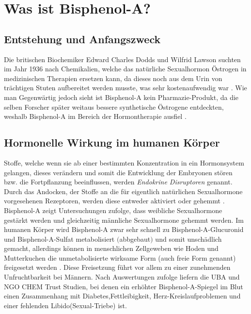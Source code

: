 \section{Was ist Bisphenol-A?}
\subsection{Entstehung und Anfangszweck}
Die britischen Biochemiker Edward Charles Dodds und Wilfrid Lawson suchten
im Jahr 1936 nach Chemikalien, welche das natürliche Sexualhormon Östrogen in medizinischen
Therapien ersetzen kann, da dieses noch aus dem Urin von trächtigen Stuten
aufbereitet werden musste, was sehr kostenaufwendig war \cite[]{Umweltbundesamt2010}.
Wie man Gegenwärtig jedoch sieht ist Bisphenol-A kein Pharmazie-Produkt, da die selben Forscher
später weitaus bessere synthetische Östrogene entdeckten, weshalb Bisphenol-A im Bereich
der Hormontherapie ausfiel \cite{Wikipedia}.
\subsection{Hormonelle Wirkung im humanen Körper}
Stoffe, welche wenn sie ab einer bestimmten Konzentration in ein Hormonsystem gelangen,
dieses verändern und somit die Entwicklung der Embryonen stören bzw. die Fortpflanzung
beeinflussen, werden \textit{Endokrine Disruptoren} genannt.
Durch das Andocken, der Stoffe an die für eigentlich natürlichen Sexualhormone
vorgesehenen Rezeptoren, werden diese entweder aktiviert oder gehemmt \cite{Umweltbundesamt2010}.
Bisphenol-A zeigt Untersuchungen zufolge, dass weibliche Sexualhormone gestärkt werden und
gleichzeitig männliche Sexualhormone gehemmt werden.
Im humanen Körper wird Bisphenol-A zwar sehr schnell zu Bisphenol-A-Glucuronid und
Bisphenol-A-Sulfat metabolisiert $($abbgebaut$)$ und somit unschädlich gemacht, allerdings
können in menschlichen Zellgeweben wie Hoden und Mutterkuchen die unmetabolisierte wirksame
Form (auch freie Form genannt) freigesetzt werden \cite{Umweltbundesamt2010}.
Diese Freisetzung führt vor allem zu einer zunehmenden Unfruchtbarkeit bei Männern. Nach Auswertungen zufolge liefern die UBA und NGO CHEM Trust Studien, bei denen ein erhöhter Bisphenol-A-Spiegel im Blut einen Zusammenhang mit Diabetes,Fettleibigkeit, Herz-Kreislaufproblemen und einer fehlenden Libido(Sexual-Triebe) ist.
